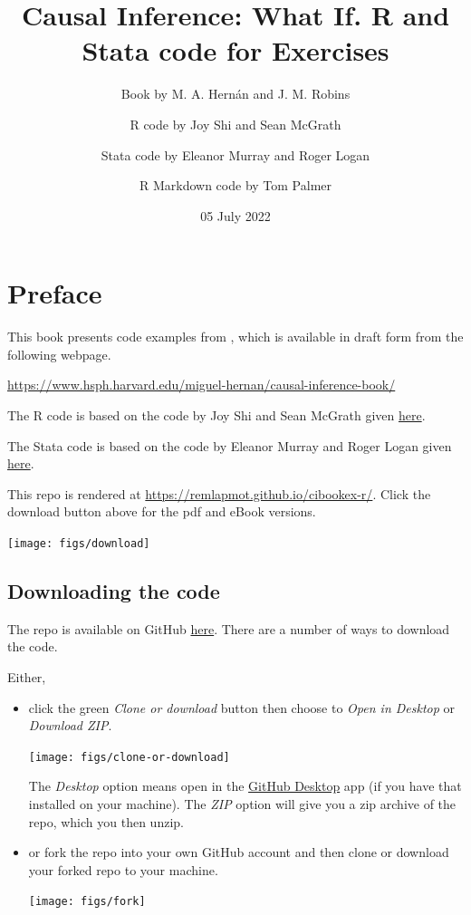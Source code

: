 \documentclass[
  10pt,
]{book}
\title{Causal Inference: What If. R and Stata code for Exercises}
\author{Book by M. A. Hernán and J. M. Robins \and R code by Joy Shi and Sean McGrath \and Stata code by Eleanor Murray and Roger Logan \and R Markdown code by Tom Palmer}
\date{05 July 2022}
\begin{document}
\maketitle

\thispagestyle{empty}

{
\setcounter{tocdepth}{1}
\tableofcontents
}
\hypertarget{preface}{%
\chapter*{Preface}\label{preface}}

This book presents code examples from \citet{ci-book}, which is available in draft form from the following webpage.

\url{https://www.hsph.harvard.edu/miguel-hernan/causal-inference-book/}

The R code is based on the code by Joy Shi and Sean McGrath given \href{https://cdn1.sph.harvard.edu/wp-content/uploads/sites/1268/1268/20/Rcode_CIpart2.zip}{here}.

The Stata code is based on the code by Eleanor Murray and Roger Logan given \href{https://cdn1.sph.harvard.edu/wp-content/uploads/sites/1268/2019/11/stata_part2.zip}{here}.

This repo is rendered at \url{https://remlapmot.github.io/cibookex-r/}. Click the download button above for the pdf and eBook versions.

\begin{center}\texttt{[image: figs/download]} \end{center}

\hypertarget{downloading-the-code}{%
\section{Downloading the code}\label{downloading-the-code}}

The repo is available on GitHub \href{https://github.com/remlapmot/cibookex-r}{here}. There are a number of ways to download the code.

Either,

\begin{itemize}
\item
  click the green \emph{Clone or download} button then choose to \emph{Open in Desktop} or \emph{Download ZIP}.

  \begin{center}\texttt{[image: figs/clone-or-download]} \end{center}

  The \emph{Desktop} option means open in the \href{https://desktop.github.com/}{GitHub Desktop} app (if you have that installed on your machine). The \emph{ZIP} option will give you a zip archive of the repo, which you then unzip.
\item
  or fork the repo into your own GitHub account and then clone or download your forked repo to your machine.

  \begin{center}\texttt{[image: figs/fork]} \end{center}
\end{itemize}
\end{document}
